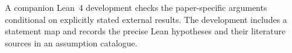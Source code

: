A companion Lean~4 development checks the paper-specific arguments
conditional on explicitly stated external results. The development
includes a statement map and records the precise Lean hypotheses
and their literature sources in an assumption catalogue.
